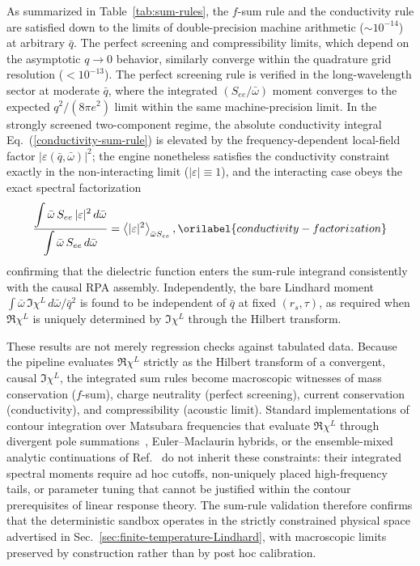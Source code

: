 \documentclass[aps,showkeys,noshowpacs,superscriptaddress,pre,preprint]{revtex4-2}
\let\label\orilabel
\begin{document}
As summarized in Table~\ref{tab:sum-rules}, the $f$-sum rule and the conductivity rule are satisfied down to the limits of double-precision machine arithmetic ($\sim 10^{-14}$) at arbitrary $\bar{q}$.
The perfect screening and compressibility limits, which depend on the asymptotic $q \to 0$ behavior, similarly converge within the quadrature grid resolution ($< 10^{-13}$).
The perfect screening rule is verified in the long-wavelength sector at moderate $\bar{q}$,
where the integrated $(S_{ee}/\bar{\omega})$ moment converges to the expected $q^2/(8\pi e^2)$ limit
within the same machine-precision limit.
In the strongly screened two-component regime, the absolute conductivity integral
Eq.~(\ref{conductivity-sum-rule}) is elevated by the frequency-dependent local-field factor
$|\varepsilon(\bar{q}, \bar{\omega})|^2$;
the engine nonetheless satisfies the conductivity constraint exactly in the non-interacting limit
($|\varepsilon| \equiv 1$), and the interacting case obeys the exact spectral factorization
\begin{equation}
\frac{\displaystyle \int \bar{\omega}\, S_{ee}\, |\varepsilon|^2 \, d\bar{\omega}}
     {\displaystyle \int \bar{\omega}\, S_{ee} \, d\bar{\omega}}
= \left\langle |\varepsilon|^2 \right\rangle_{\bar{\omega} S_{ee}} ,
\label{conductivity-factorization}
\end{equation}
confirming that the dielectric function enters the sum-rule integrand consistently with the
causal RPA assembly.
Independently, the bare Lindhard moment
$\int \bar{\omega}\, \Im \chi^L \, d\bar{\omega} / \bar{q}^2$
is found to be independent of $\bar{q}$ at fixed $(r_s, \tau)$,
as required when $\Re \chi^L$ is uniquely determined by $\Im \chi^L$ through the Hilbert transform.

These results are not merely regression checks against tabulated data.
Because the pipeline evaluates $\Re \chi^L$ strictly as the Hilbert transform of a convergent,
causal $\Im \chi^L$, the integrated sum rules become macroscopic witnesses of
mass conservation ($f$-sum), charge neutrality (perfect screening),
current conservation (conductivity), and compressibility (acoustic limit).
Standard implementations of contour integration over Matsubara frequencies that evaluate $\Re \chi^L$ through divergent pole summations~\cite{Khanna-Glyde1976,Gouedard-Deutsch1978},
Euler--Maclaurin hybrids, or the ensemble-mixed analytic continuations of Ref.~\cite{Giuliani-Vignale2005}
do not inherit these constraints: their integrated spectral moments require ad hoc cutoffs,
non-uniquely placed high-frequency tails, or parameter tuning that cannot be justified
within the contour prerequisites of linear response theory.
The sum-rule validation therefore confirms that the deterministic sandbox
operates in the strictly constrained physical space advertised in Sec.~\ref{sec:finite-temperature-Lindhard},
with macroscopic limits preserved by construction rather than by post hoc calibration.
\end{document}
